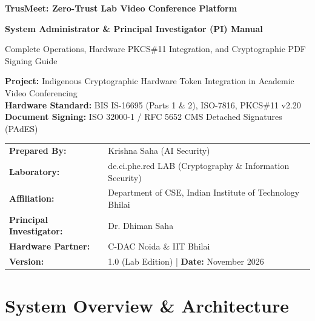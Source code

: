 \documentclass[11pt,a4paper]{report}
\begin{document}
\begin{titlepage}
    \centering
    \vspace*{1.5cm}
    
    {\Huge\bfseries\color{cdacblue} TrusMeet: Zero-Trust Lab Video Conference Platform\par}
    \vspace{0.8cm}
    {\LARGE\bfseries\color{darkgray} System Administrator \& Principal Investigator (PI) Manual\par}
    \vspace{0.4cm}
    {\large Complete Operations, Hardware PKCS\#11 Integration, and Cryptographic PDF Signing Guide\par}
    
    \vspace{2.5cm}
    \begin{tcolorbox}[colback=lightgray,colframe=cdacblue,width=0.9\textwidth,arc=2mm]
    \centering
    \textbf{Project:} Indigenous Cryptographic Hardware Token Integration in Academic Video Conferencing\\
    \textbf{Hardware Standard:} BIS IS-16695 (Parts 1 \& 2), ISO-7816, PKCS\#11 v2.20\\
    \textbf{Document Signing:} ISO 32000-1 / RFC 5652 CMS Detached Signatures (PAdES)
    \end{tcolorbox}
    
    \vspace{2.5cm}
    \begin{tabular}{ll}
    \textbf{Prepared By:} & Krishna Saha (AI Security) \\
    \textbf{Laboratory:} & de.ci.phe.red LAB (Cryptography \& Information Security) \\
    \textbf{Affiliation:} & Department of CSE, Indian Institute of Technology Bhilai \\
    \textbf{Principal Investigator:} & Dr. Dhiman Saha \\
    \textbf{Hardware Partner:} & C-DAC Noida \& IIT Bhilai \\
    \textbf{Version:} & 1.0 (Lab Edition) \quad | \quad \textbf{Date:} November 2026
    \end{tabular}
    
    \vfill
\end{titlepage}

\tableofcontents
\newpage

\chapter{System Overview \& Architecture}
\end{document}
